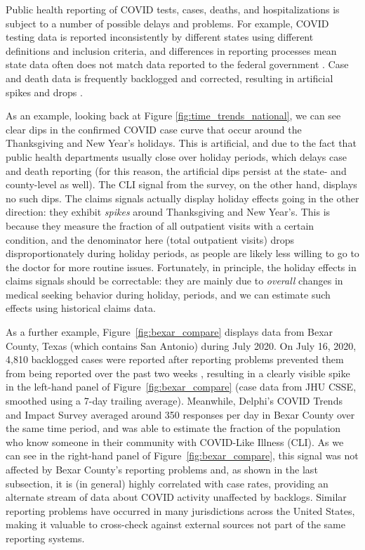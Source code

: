\documentclass[9pt,twocolumn,twoside,lineno]{pnas-new}
\begin{document}
Public health reporting of COVID tests, cases, deaths, and hospitalizations is
subject to a number of possible delays and problems. For example, COVID testing
data is reported inconsistently by different states using different definitions
and inclusion criteria, and differences in reporting processes mean state data
often does not match data reported to the federal government
\cite{Schechtman:2021}. Case and death data is frequently backlogged and
corrected, resulting in artificial spikes and drops \cite{Simon:2021,
  ArvisaisAnhalt:2021}.

As an example, looking back at Figure \ref{fig:time_trends_national}, we can see
clear dips in the confirmed COVID case curve that occur around the Thanksgiving
and New Year's holidays. This is artificial, and due to the fact that public
health departments usually close over holiday periods, which delays case and
death reporting (for this reason, the artificial dips persist at the state- and
county-level as well). The CLI signal from the survey, on the other hand,
displays no such dips. The claims signals actually display holiday effects going
in the other direction: they exhibit \textit{spikes} around Thanksgiving and New
Year's. This is because they measure the fraction of all outpatient visits with
a certain condition, and the denominator here (total outpatient visits) drops
disproportionately during holiday periods, as people are likely less willing to
go to the doctor for more routine issues. Fortunately, in principle, the holiday
effects in claims signals should be correctable: they are mainly due to
\textit{overall} changes in medical seeking behavior during holiday, periods,
and we can estimate such effects using historical claims data.

As a further example, Figure~\ref{fig:bexar_compare} displays data from Bexar
County, Texas (which contains San Antonio) during July 2020. On July 16, 2020,
4,810 backlogged cases were reported after reporting problems prevented them
from being reported over the past two weeks \cite{Palacios:2021}, resulting in a
clearly visible spike in the left-hand panel of Figure~\ref{fig:bexar_compare}
(case data from JHU CSSE, smoothed using a 7-day trailing average).  Meanwhile,
Delphi's COVID Trends and Impact Survey averaged around 350 responses per day in
Bexar County over the same time period, and was able to estimate the fraction of
the population who know someone in their community with COVID-Like Illness
(CLI). As we can see in the right-hand panel of Figure~\ref{fig:bexar_compare},
this signal was not affected by Bexar County's reporting problems and, as shown
in the last subsection, it is (in general) highly correlated with case rates,
providing an alternate stream of data about COVID activity unaffected by
backlogs. Similar reporting problems have occurred in many jurisdictions across
the United States, making it valuable to cross-check against external sources
not part of the same reporting systems.
\end{document}
